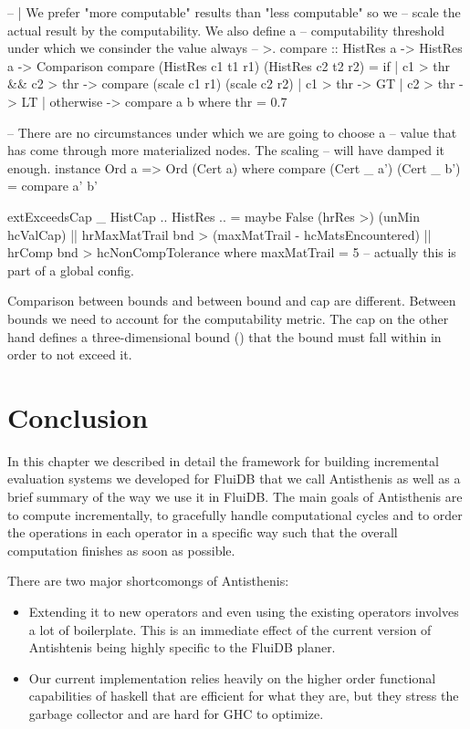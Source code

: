 \begin{code}
\begin{haskellcode}
-- | We prefer "more computable" results than "less computable" so we
-- scale the actual result by the computability. We also define a
-- computability threshold under which we consinder the value always
-- >.
compare :: HistRes a -> HistRes a -> Comparison
compare (HistRes c1 t1 r1) (HistRes c2 t2 r2) =
  if
    | c1 > thr && c2 > thr -> compare (scale c1 r1) (scale c2 r2)
    | c1 > thr             -> GT
    | c2 > thr             -> LT
    | otherwise            -> compare a b
  where
    thr = 0.7

-- There are no circumstances under which we are going to choose a
-- value that has come through more materialized nodes. The scaling
-- will have damped it enough.
instance Ord a => Ord (Cert a) where
  compare (Cert _ a') (Cert _ b') = compare a' b'

extExceedsCap _ HistCap {..} HistRes {..} =
  maybe False (hrRes >) (unMin hcValCap)
  || hrMaxMatTrail bnd > (maxMatTrail - hcMatsEncountered)
  || hrComp bnd > hcNonCompTolerance
  where
    maxMatTrail = 5 -- actually this is part of a global config.
\end{haskellcode}
\caption{\label{lst:hist_compare}Comparison between bounds and
  between bound and cap are different. Between bounds we need to
  account for the computability metric. The cap on the other hand
  defines a three-dimensional bound () that the bound must fall
  within in order to not exceed it.}
\end{code}

\section{Conclusion}

In this chapter we described in detail the framework for building
incremental evaluation systems we developed for FluiDB that we call
Antisthenis as well as a brief summary of the way we use it in
FluiDB. The main goals of Antisthenis are to compute incrementally, to
gracefully handle computational cycles and to order the operations in
each operator in a specific way such that the overall computation
finishes as soon as possible.

There are two major shortcomongs of Antisthenis:

\begin{itemize}
\item Extending it to new operators and even using the existing operators
involves a lot of boilerplate. This is an immediate effect of the
current version of Antishtenis being highly specific to the FluiDB
planer.
\item Our current implementation relies heavily on the higher order
functional capabilities of haskell that are efficient for what they
are, but they stress the garbage collector and are hard for GHC to
optimize.
\end{itemize}

